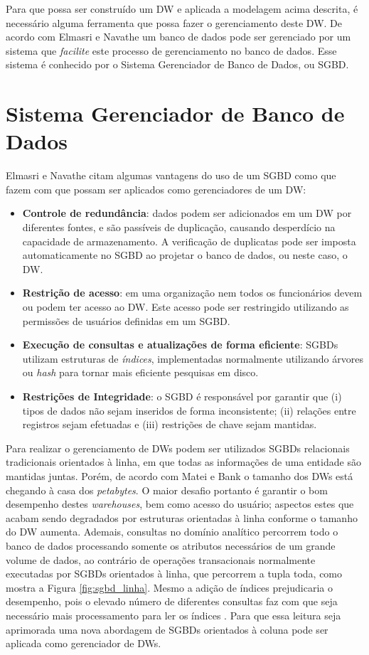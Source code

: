 Para que possa ser construído um DW e aplicada a modelagem acima descrita, é necessário alguma ferramenta que possa fazer o gerenciamento deste DW. De acordo com Elmasri e Navathe \cite{navathe2011banco} um banco de dados pode ser gerenciado por um sistema que \textit{facilite} este processo de gerenciamento no banco de dados. Esse sistema é conhecido por o Sistema Gerenciador de Banco de Dados, ou SGBD.

\section{Sistema Gerenciador de Banco de Dados}

Elmasri e Navathe \cite{navathe2011banco} citam algumas vantagens do uso de um SGBD como que fazem com que possam ser aplicados como gerenciadores de um DW:

\begin{itemize}
    \item \textbf{Controle de redundância}: dados podem ser adicionados em um DW por diferentes fontes, e são passíveis de duplicação, causando desperdício na capacidade de armazenamento. A verificação de duplicatas pode ser imposta automaticamente no SGBD ao projetar o banco de dados, ou neste caso, o DW.
    \item \textbf{Restrição de acesso}: em uma organização nem todos os funcionários devem ou podem ter acesso ao DW. Este acesso pode ser restringido utilizando as permissões de usuários definidas em um SGBD.
    \item \textbf{Execução de consultas e atualizações de forma eficiente}: SGBDs utilizam estruturas de \textit{índices}, implementadas normalmente utilizando árvores ou \textit{hash} para tornar mais eficiente pesquisas em disco. 
    \item \textbf{Restrições de Integridade}: o SGBD é responsável por garantir que (i) tipos de dados não sejam inseridos de forma inconsistente; (ii) relações entre registros sejam efetuadas e (iii) restrições de chave sejam mantidas.
\end{itemize}

Para realizar o gerenciamento de DWs podem ser utilizados SGBDs relacionais tradicionais orientados à linha, em que todas as informações de uma entidade são mantidas juntas. Porém, de acordo com Matei e Bank \cite{matei2010column} o tamanho dos DWs está chegando à casa dos \textit{petabytes}. O maior desafio portanto é garantir o bom desempenho destes \textit{warehouses}, bem como acesso do usuário; aspectos estes que acabam sendo degradados por estruturas orientadas à linha conforme o tamanho do DW aumenta. Ademais, consultas no domínio analítico percorrem todo o banco de dados processando somente os atributos necessários de um grande volume de dados, ao contrário de operações transacionais normalmente executadas por SGBDs orientados à linha, que percorrem a tupla toda, como mostra a Figura \ref{fig:sgbd_linha}. Mesmo a adição de índices prejudicaria o desempenho, pois o elevado número de diferentes consultas faz com que seja necessário mais processamento para ler os índices \cite{matei2010column}. Para que essa leitura seja aprimorada uma nova abordagem de SGBDs orientados à coluna pode ser aplicada como gerenciador de DWs.

